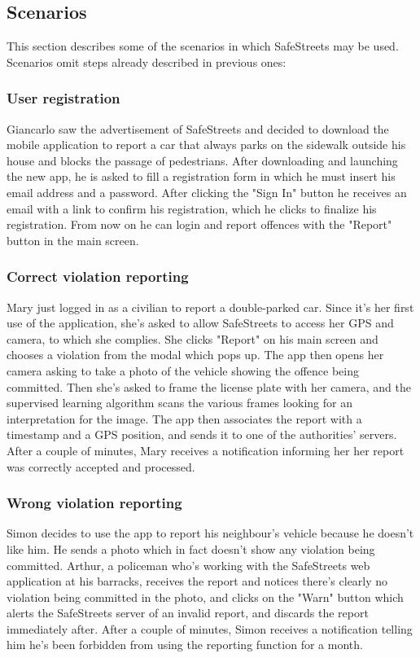 \documentclass[12pt,a4paper]{article}
\begin{document}
\subsection{Scenarios}
This section describes some of the scenarios in which SafeStreets may be used. Scenarios omit steps already described in previous ones: 

\subsubsection{User registration}
Giancarlo saw the advertisement of SafeStreets and decided to download the mobile application to report a car that always parks on the sidewalk outside his house and blocks the passage of pedestrians. After downloading and launching the new app, he is asked to fill a registration form in which he must insert his email address and a password. After clicking the "Sign In" button he receives an email with a link to confirm his registration, which he clicks to finalize his registration. From now on he can login and report offences with the "Report" button in the main screen.

\subsubsection{Correct violation reporting}
Mary just logged in as a civilian to report a double-parked car. Since it's her first use of the application, she's asked to allow SafeStreets to access her GPS and camera, to which she complies. She clicks "Report" on his main screen and chooses a violation from the modal which pops up. The app then opens her camera asking to take a photo of the vehicle showing the offence being committed. Then she's asked to frame the license plate with her camera, and the supervised learning algorithm scans the various frames looking for an interpretation for the image. The app then associates the report with a timestamp and a GPS position, and sends it to one of the authorities' servers. After a couple of minutes, Mary receives a notification informing her her report was correctly accepted and processed.

\subsubsection{Wrong violation reporting}
Simon decides to use the app to report his neighbour's vehicle because he doesn't like him. He sends a photo which in fact doesn't show any violation being committed. Arthur, a policeman who's working with the SafeStreets web application at his barracks, receives the report and notices there's clearly no violation being committed in the photo, and clicks on the "Warn" button which alerts the SafeStreets server of an invalid report, and discards the report immediately after. After a couple of minutes, Simon receives a notification telling him he's been forbidden from using the reporting function for a month.
\end{document}

